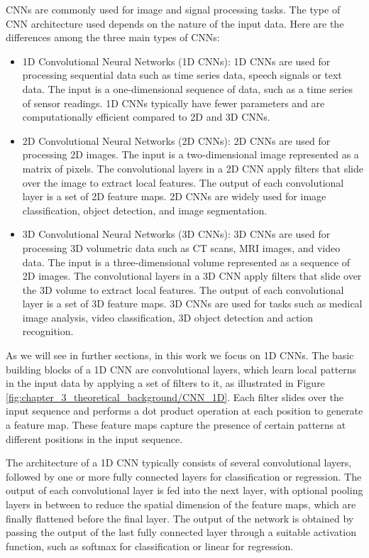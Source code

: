 \acp{CNN} are commonly used for image and signal processing tasks. The type of CNN architecture used depends on the nature of the input data. Here are the differences among the three main types of \acp{CNN}:

\begin{itemize}
	
	\item 1D Convolutional Neural Networks (1D CNNs): 1D CNNs are used for processing sequential data such as time series data, speech signals or text data. The input is a one-dimensional sequence of data, such as a time series of sensor readings. 1D CNNs typically have fewer parameters and are computationally efficient compared to 2D and 3D CNNs.
	
	\item 2D Convolutional Neural Networks (2D CNNs): 2D CNNs are used for processing 2D images. The input is a two-dimensional image represented as a matrix of pixels. The convolutional layers in a 2D CNN apply filters that slide over the image to extract local features. The output of each convolutional layer is a set of 2D feature maps. 2D CNNs are widely used for image classification, object detection, and image segmentation.
	
	\item 3D Convolutional Neural Networks (3D CNNs): 3D CNNs are used for processing 3D volumetric data such as CT scans, MRI images, and video data. The input is a three-dimensional volume represented as a sequence of 2D images. The convolutional layers in a 3D CNN apply filters that slide over the 3D volume to extract local features. The output of each convolutional layer is a set of 3D feature maps. 3D CNNs are used for tasks such as medical image analysis, video classification, 3D object detection and action recognition.
\end{itemize}

As we will see in further sections, in this work we focus on 1D CNNs. The basic building blocks of a 1D CNN are convolutional layers, which learn local patterns in the input data by applying a set of filters to it, as illustrated in Figure \ref{fig:chapter_3_theoretical_background/CNN_1D}. Each filter slides over the input sequence and performs a dot product operation at each position to generate a feature map. These feature maps capture the presence of certain patterns at different positions in the input sequence. 
 
The architecture of a 1D CNN typically consists of several convolutional layers, followed by one or more fully connected layers for classification or regression. The output of each convolutional layer is fed into the next layer, with optional pooling layers in between to reduce the spatial dimension of the feature maps, which are finally flattened before the final layer. The output of the network is obtained by passing the output of the last fully connected layer through a suitable activation function, such as softmax for classification or linear for regression.
 
